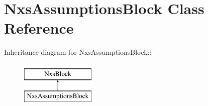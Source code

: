 \hypertarget{classNxsAssumptionsBlock}{
\section{NxsAssumptionsBlock Class Reference}
\label{classNxsAssumptionsBlock}
}
Inheritance diagram for NxsAssumptionsBlock::\begin{figure}[H]
\begin{center}
\leavevmode
\includegraphics[height=2cm]{classNxsAssumptionsBlock}
\end{center}
\end{figure}
